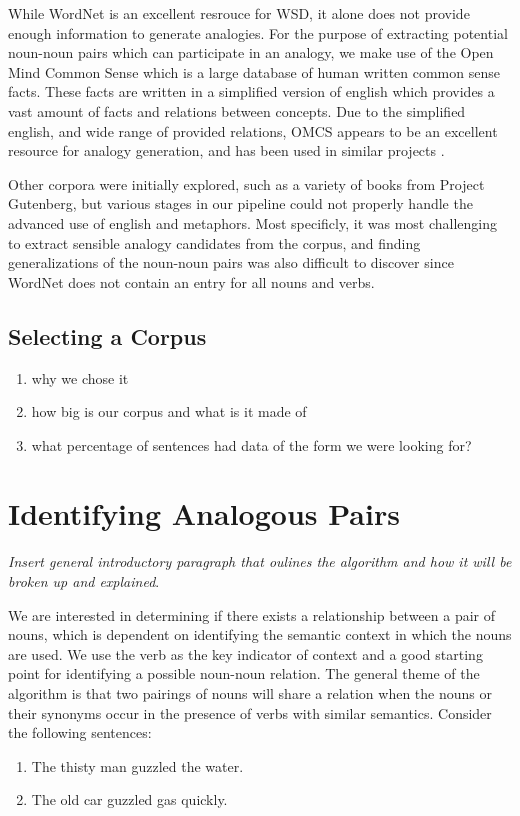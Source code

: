 \documentclass[11pt]{article}
\begin{document}
While WordNet is an excellent resrouce for WSD, it alone does not provide enough
information to generate analogies.  For the purpose of extracting potential
noun-noun pairs which can participate in an analogy, we make use of the Open
Mind Common Sense \cite{omcs?} which is a large database of human written common
sense facts.  These facts are written in a simplified version of english which
provides a vast amount of facts and relations between concepts.  Due to the
simplified english, and wide range of provided relations, OMCS appears to be an
excellent resource for analogy generation, and has been used in similar projects
\cite{analogyspace}.

Other corpora were initially explored, such as a variety of books from Project
Gutenberg\cite{gutenberg}, but various stages in our pipeline could not
properly handle the advanced use of english and metaphors.  Most specificly, it
was most challenging to extract sensible analogy candidates from the corpus, and
finding generalizations of the noun-noun pairs was also difficult to discover
since WordNet does not contain an entry for all nouns and verbs.

\subsection{Selecting a Corpus}

\begin{enumerate}
  \item why we chose it
  \item how big is our corpus and what is it made of
  \item what percentage of sentences had data of the form we were looking for?
\end{enumerate}

\section{Identifying Analogous Pairs}

\emph{Insert general introductory paragraph that oulines the algorithm and how
  it will be broken up and explained}.

We are interested in determining if there exists a relationship between a pair
of nouns, which is dependent on identifying the semantic context in which the
nouns are used.  We use the verb as the key indicator of context and a good
starting point for identifying a possible noun-noun relation.  The general theme
of the algorithm is that two pairings of nouns will share a relation when the
nouns or their synonyms occur in the presence of verbs with similar semantics.
Consider the following sentences:
\begin{enumerate}
  \item The thisty man guzzled the water.
  \item The old car guzzled gas quickly.
\end{enumerate}
\end{document}
